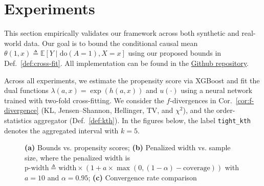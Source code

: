 \section{Experiments}
\label{sec:experiments}

This section empirically validates our framework across both synthetic and real-world data. Our goal is to bound the conditional causal mean $\theta(1,x) \triangleq \mathbb{E}[Y \mid \mathrm{do}(A=1), X=x]$ using our proposed bounds in Def.~\ref{def:cross-fit}. All implementation can be found in the \href{https://github.com/yonghanjung/Information-Theretic-Bounds}{Github repository}. 

Across all experiments, we estimate the propensity score via XGBoost \citep{chen2016xgboost} and fit the dual functions $\lambda(a,x)=\exp(h(a,x))$ and $u(\cdot)$ using a neural network trained with two-fold cross-fitting. We consider the $f$-divergences in Cor.~\ref{cor:f-divergence} (KL, Jensen--Shannon, Hellinger, TV, and $\chi^2$), and the order-statistics aggregator (Def.~\ref{def:kth}). In the figures below, the label \texttt{tight\_kth} denotes the aggregated interval with $k= 5$. 


\begin{figure}[t]
    \centering
    \begin{minipage}[b]{0.32\textwidth}
        \centering
    \end{minipage}\hfill
    \begin{minipage}[b]{0.32\textwidth}
        \centering
    \end{minipage}\hfill
    \begin{minipage}[b]{0.32\textwidth}
        \centering
    \end{minipage}
    \caption{\textbf{(a)} Bounds vs. propensity scores; \textbf{(b)} Penalized width vs. sample size, where the penalized width is $\text{p-width}\triangleq \mathrm{width} \times (1+ a \times \max (0, (1-\alpha)-\mathrm{coverage}))$ with $a=10$ and $\alpha=0.95$; \textbf{(c)} Convergence rate comparison}
    \label{fig:synthetic}
\end{figure}

